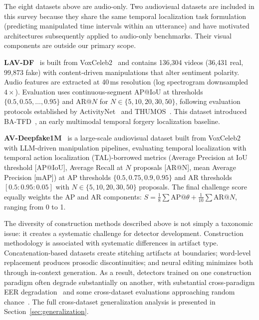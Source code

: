 \documentclass[journal]{IEEEtran}
\begin{document}
The eight datasets above are audio-only. Two audiovisual datasets are included in this survey because they share the same temporal localization task formulation (predicting manipulated time intervals within an utterance) and have motivated architectures subsequently applied to audio-only benchmarks. Their visual components are outside our primary scope.

\textbf{LAV-DF}~\cite{cai2022lavdf,cai2023lavdf_cviu} is built from VoxCeleb2~\cite{chung2018voxceleb2} and contains 136,304 videos (36,431 real, 99,873 fake) with content-driven manipulations that alter sentiment polarity. Audio features are extracted at 40\,ms resolution (log spectrogram downsampled $4\times$). Evaluation uses continuous-segment AP@IoU at thresholds $\{0.5, 0.55, \ldots, 0.95\}$ and AR@$N$ for $N \in \{5, 10, 20, 30, 50\}$, following evaluation protocols established by ActivityNet~\cite{heilbron2015activitynet} and THUMOS~\cite{idrees2017thumos}. This dataset introduced BA-TFD~\cite{cai2022lavdf}, an early multimodal temporal forgery localization baseline.

\textbf{AV-Deepfake1M}~\cite{cai2024avdeepfake1m} is a large-scale audiovisual dataset built from VoxCeleb2~\cite{chung2018voxceleb2} with LLM-driven manipulation pipelines, evaluating temporal localization with temporal action localization (TAL)-borrowed metrics (Average Precision at IoU threshold [AP@IoU], Average Recall at $N$ proposals [AR@N], mean Average Precision [mAP]) at AP thresholds $\{0.5, 0.75, 0.9, 0.95\}$ and AR thresholds $[0.5{:}0.95{:}0.05]$ with $N \in \{5, 10, 20, 30, 50\}$ proposals. The final challenge score equally weights the AP and AR components: $S = \tfrac{1}{8}\sum \text{AP@}\theta + \tfrac{1}{10}\sum \text{AR@}N$, ranging from 0 to 1.

The diversity of construction methods described above is not simply a taxonomic issue: it creates a systematic challenge for detector development. Construction methodology is associated with systematic differences in artifact type. Concatenation-based datasets create stitching artifacts at boundaries; word-level replacement produces prosodic discontinuities; and neural editing minimizes both through in-context generation. As a result, detectors trained on one construction paradigm often degrade substantially on another, with substantial cross-paradigm EER degradation~\cite{zhang2025partialedit} and some cross-dataset evaluations approaching random chance~\cite{li2025hqmpsd}. The full cross-dataset generalization analysis is presented in Section~\ref{sec:generalization}.
\end{document}
